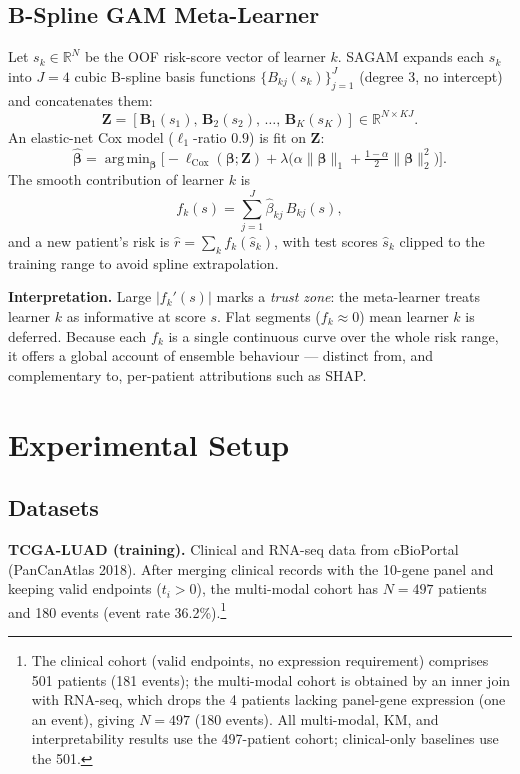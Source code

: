 \documentclass[journal]{IEEEtran}
\DeclareMathOperator*{\argmin}{arg\,min}
\begin{document}
\subsection{B-Spline GAM Meta-Learner}
\label{sec:gam}
Let $s_k\in\mathbb{R}^N$ be the OOF risk-score vector of learner $k$. SAGAM
expands each $s_k$ into $J{=}4$ cubic B-spline basis functions
$\{B_{kj}(s_k)\}_{j=1}^{J}$ (degree 3, no intercept) and concatenates them:
\begin{equation}
  \mathbf{Z}=[\mathbf{B}_1(s_1),\,\mathbf{B}_2(s_2),\,\dots,\,\mathbf{B}_K(s_K)]
  \in\mathbb{R}^{N\times KJ}.
  \label{eq:spline_matrix}
\end{equation}
An elastic-net Cox model ($\ell_1$-ratio $0.9$) is fit on $\mathbf{Z}$:
\begin{equation}
  \hat{\boldsymbol{\beta}}=\argmin_{\boldsymbol{\beta}}
  \Big[-\ell_{\mathrm{Cox}}(\boldsymbol{\beta};\mathbf{Z})
  +\lambda\big(\alpha\|\boldsymbol{\beta}\|_1
  +\tfrac{1-\alpha}{2}\|\boldsymbol{\beta}\|_2^2\big)\Big].
  \label{eq:coxnet}
\end{equation}
The smooth contribution of learner $k$ is
\begin{equation}
  f_k(s)=\sum_{j=1}^{J}\hat\beta_{kj}\,B_{kj}(s),
  \label{eq:smooth}
\end{equation}
and a new patient's risk is $\hat r=\sum_k f_k(\hat s_k)$, with test scores
$\hat s_k$ clipped to the training range to avoid spline extrapolation.

\noindent\textbf{Interpretation.} Large $|f_k'(s)|$ marks a \emph{trust zone}:
the meta-learner treats learner $k$ as informative at score $s$. Flat segments
($f_k\!\approx\!0$) mean learner $k$ is deferred. Because each $f_k$ is a
single continuous curve over the whole risk range, it offers a global account
of ensemble behaviour --- distinct from, and complementary to, per-patient
attributions such as SHAP.

\section{Experimental Setup}
\label{sec:exp}

\subsection{Datasets}
\textbf{TCGA-LUAD (training).} Clinical and RNA-seq data from cBioPortal
(PanCanAtlas 2018). After merging clinical records with the 10-gene panel and
keeping valid endpoints ($t_i{>}0$), the multi-modal cohort has $N{=}497$
patients and 180 events (event rate 36.2\%).\footnote{The clinical cohort
(valid endpoints, no expression requirement) comprises 501 patients (181
events); the multi-modal cohort is obtained by an inner join with RNA-seq,
which drops the 4 patients lacking panel-gene expression (one an event),
giving $N{=}497$ (180 events). All multi-modal, KM, and interpretability
results use the 497-patient cohort; clinical-only baselines use the 501.}
\end{document}
